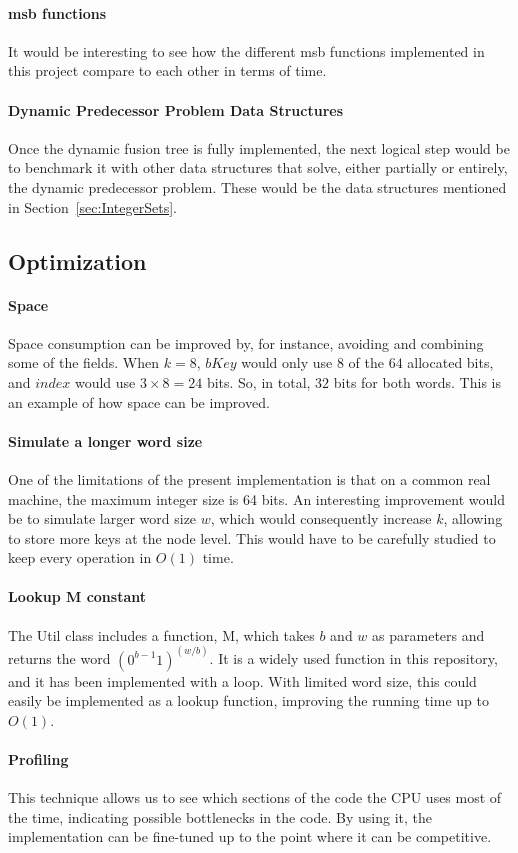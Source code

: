 \paragraph*{msb functions}
It would be interesting to see how the different msb functions implemented in this project compare to each other in terms of time.

\paragraph*{Dynamic Predecessor Problem Data Structures}
Once the dynamic fusion tree is fully implemented, the next logical step would be to benchmark it with other data structures that solve, either partially or entirely, the dynamic predecessor problem. These would be the data structures mentioned in Section~\ref{sec:IntegerSets}.

\subsection{Optimization}

\paragraph*{Space}
Space consumption can be improved by, for instance, avoiding and combining some of the fields. When $k = 8$, $bKey$ would only use $8$ of the $64$ allocated bits, and $index$ would use $3 \times 8 = 24$ bits. So, in total, $32$ bits for both words. This is an example of how space can be improved.

\paragraph*{Simulate a longer word size}
One of the limitations of the present implementation is that on a common real machine, the maximum integer size is 64 bits. An interesting improvement would be to simulate larger word size $w$, which would consequently increase $k$, allowing to store more keys at the node level. This would have to be carefully studied to keep every operation in $O(1)$ time.


\paragraph*{Lookup {\ttfamily M} constant}
The {\ttfamily Util} class includes a function, {\ttfamily M}, which takes $b$ and $w$ as parameters and returns the word $(0^{b-1}1)^{(w/b)}$. It is a widely used function in this repository, and it has been implemented with a loop. With limited word size, this could easily be implemented as a lookup function, improving the running time up to $O(1)$.

\paragraph*{Profiling}
This technique allows us to see which sections of the code the CPU uses most of the time, indicating possible bottlenecks in the code. By using it, the implementation can be fine-tuned up to the point where it can be competitive.